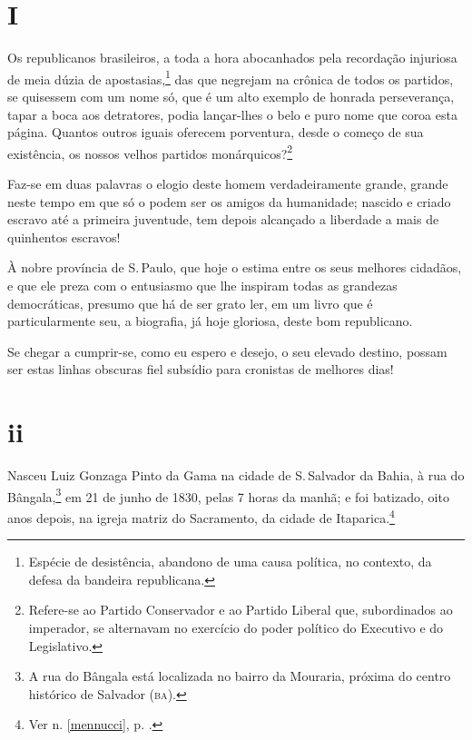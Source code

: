 \section*{I}

\noindent{}Os republicanos brasileiros, a toda a hora abocanhados pela recordação
injuriosa de meia dúzia de apostasias,\footnote{Espécie de desistência,
  abandono de uma causa política, no contexto, da defesa da bandeira
  republicana.} das que negrejam na crônica de todos os partidos, se
quisessem com um nome só, que é um alto exemplo de honrada perseverança,
tapar a boca aos detratores, podia lançar-lhes o belo e puro nome que
coroa esta página. Quantos outros iguais oferecem porventura, desde o
começo de sua existência, os nossos velhos partidos
monárquicos?\footnote{Refere-se ao Partido Conservador e ao Partido
  Liberal que, subordinados ao imperador, se alternavam no exercício do
  poder político do Executivo e do Legislativo.}

Faz-se em duas palavras o elogio deste homem verdadeiramente grande,
grande neste tempo em que só o podem ser os amigos da humanidade;
nascido e criado escravo até a primeira juventude, tem depois alcançado
a liberdade a mais de quinhentos escravos!

À nobre província de S.\,Paulo, que hoje o estima entre os seus melhores
cidadãos, e que ele preza com o entusiasmo que lhe inspiram todas as
grandezas democráticas, presumo que há de ser grato ler, em um livro que
é particularmente seu, a biografia, já hoje gloriosa, deste bom
republicano.

Se chegar a cumprir-se, como eu espero e desejo, o seu elevado destino,
possam ser estas linhas obscuras fiel subsídio para cronistas de
melhores dias!

\section*{ii}

Nasceu Luiz Gonzaga Pinto da Gama na cidade de S.\,Salvador da Bahia, à
rua do Bângala,\footnote{A rua do Bângala está localizada no bairro da
  Mouraria, próxima do centro histórico de Salvador (\textsc{ba}).} em 21 de
junho de 1830, pelas 7 horas da manhã; e foi batizado, oito anos depois,
na igreja matriz do Sacramento, da cidade de Itaparica.\footnote{Ver n. \ref{mennucci}, p. \pageref{mennucci}.}

